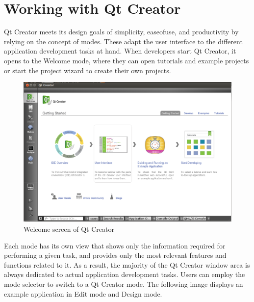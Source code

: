 \section{Working with Qt Creator}

Qt  Creator  meets  its  design  goals  of  simplicity,  ease­of­use,  and  productivity  by  relying  on the concept
of  modes.  These  adapt  the   user  interface  to  the  different  application  development  tasks  at  hand.  When
developers  start  Qt  Creator, it opens to  the Welcome mode, where they  can open tutorials and example
projects or start the project wizard to create their own projects.

\begin{figure}[h]
\begin{center}
\includegraphics[scale=0.4]{images/Qt.png}
\caption{Welcome screen of Qt Creator}
\end{center}
\end{figure}

Each  mode  has  its  own  view  that  shows  only  the  information  required  for  performing  a  given  task,   and
provides  only  the  most  relevant  features  and  functions  related  to  it.  As  a  result,  the  majority  of  the  Qt
Creator window area is always dedicated to actual application development tasks.
Users  can  employ  the  mode  selector  to  switch  to  a  Qt  Creator  mode.  The  following  image  displays an
example application in Edit mode and Design mode.

